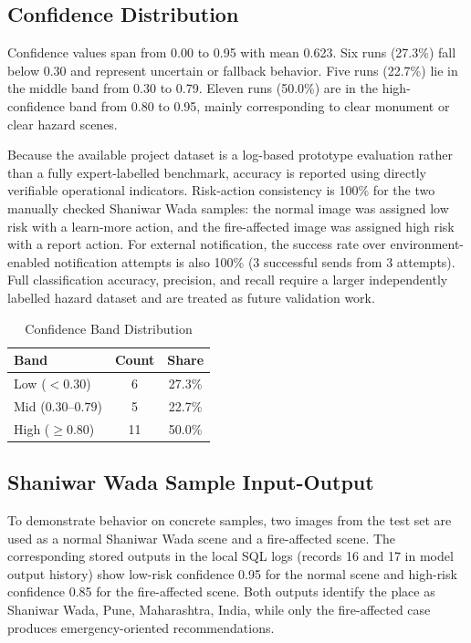\documentclass[12pt,a4paper]{article}
\begin{document}
\subsection{Confidence Distribution}
Confidence values span from 0.00 to 0.95 with mean 0.623. Six runs (27.3\%) fall below 0.30 and represent uncertain or fallback behavior. Five runs (22.7\%) lie in the middle band from 0.30 to 0.79. Eleven runs (50.0\%) are in the high-confidence band from 0.80 to 0.95, mainly corresponding to clear monument or clear hazard scenes.

Because the available project dataset is a log-based prototype evaluation rather than a fully expert-labelled benchmark, accuracy is reported using directly verifiable operational indicators. Risk-action consistency is 100\% for the two manually checked Shaniwar Wada samples: the normal image was assigned low risk with a learn-more action, and the fire-affected image was assigned high risk with a report action. For external notification, the success rate over environment-enabled notification attempts is also 100\% (3 successful sends from 3 attempts). Full classification accuracy, precision, and recall require a larger independently labelled hazard dataset and are treated as future validation work.

\begin{table}[h]
\caption{Confidence Band Distribution}
\centering
\begin{tabular}{lcc}
\toprule
\textbf{Band} & \textbf{Count} & \textbf{Share} \\
\midrule
Low ($<0.30$) & 6 & 27.3\% \\
Mid ($0.30$--$0.79$) & 5 & 22.7\% \\
High ($\geq0.80$) & 11 & 50.0\% \\
\bottomrule
\end{tabular}
\end{table}

\subsection{Shaniwar Wada Sample Input-Output}
To demonstrate behavior on concrete samples, two images from the test set are used as a normal Shaniwar Wada scene and a fire-affected scene. The corresponding stored outputs in the local SQL logs (records 16 and 17 in model output history) show low-risk confidence 0.95 for the normal scene and high-risk confidence 0.85 for the fire-affected scene. Both outputs identify the place as Shaniwar Wada, Pune, Maharashtra, India, while only the fire-affected case produces emergency-oriented recommendations.
\end{document}
